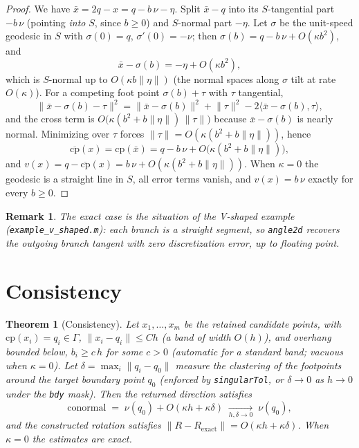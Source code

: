 \documentclass[11pt]{article}
\newtheorem{theorem}{Theorem}
\newtheorem{remark}{Remark}
\newcommand{\cp}{\mathrm{cp}}
\newcommand{\cpbar}{\overline{\mathrm{cp}}}
\newcommand{\norm}[1]{\lVert #1 \rVert}
\newcommand{\ip}[2]{\langle #1, #2 \rangle}
\begin{document}
\begin{proof}
We have $\bar x = 2q-x = q - b\,\nu - \eta$. Split $\bar x - q$ into its
$S$-tangential part $-b\,\nu$ (pointing \emph{into} $S$, since
$b\ge 0$) and $S$-normal part $-\eta$. Let $\sigma$ be the unit-speed
geodesic in $S$ with $\sigma(0)=q$, $\sigma'(0)=-\nu$; then
$\sigma(b) = q - b\,\nu + O(\kappa b^2)$, and
\[
  \bar x - \sigma(b) = -\eta + O(\kappa b^2),
\]
which is $S$-normal up to $O(\kappa b\norm{\eta})$ (the normal spaces
along $\sigma$ tilt at rate $O(\kappa)$). For a competing foot point
$\sigma(b)+\tau$ with $\tau$ tangential,
\[
  \norm{\bar x-\sigma(b)-\tau}^2
  = \norm{\bar x-\sigma(b)}^2 + \norm{\tau}^2
    - 2\ip{\bar x-\sigma(b)}{\tau},
\]
and the cross term is
$O\bigl(\kappa(b^2+b\norm{\eta})\,\norm{\tau}\bigr)$ because
$\bar x-\sigma(b)$ is nearly normal. Minimizing over $\tau$ forces
$\norm{\tau}=O(\kappa(b^2+b\norm{\eta}))$, hence
\[
  \cpbar(x) = \cp(\bar x)
  = q - b\,\nu + O\bigl(\kappa(b^2+b\norm{\eta})\bigr),
\]
and $v(x)=q-\cpbar(x)=b\,\nu+O(\kappa(b^2+b\norm{\eta}))$. When
$\kappa=0$ the geodesic is a straight line in $S$, all error terms
vanish, and $v(x)=b\,\nu$ exactly for every $b\ge0$.
\end{proof}

\begin{remark}
The exact case is the situation of the V-shaped example
(\texttt{example\_v\_shaped.m}): each branch is a straight segment, so
\texttt{angle2d} recovers the outgoing branch tangent with zero
discretization error, up to floating point.
\end{remark}

\section{Consistency}

\begin{theorem}[Consistency]\label{thm:consistency}
Let $x_1,\dots,x_m$ be the retained candidate points, with
$\cp(x_i)=q_i\in\Gamma$, $\norm{x_i-q_i}\le Ch$ (a band of width
$O(h)$), and overhang bounded below, $b_i\ge c\,h$ for some $c>0$
(automatic for a standard band; vacuous when $\kappa=0$). Let
$\delta=\max_i\norm{q_i-q_0}$ measure the clustering of the footpoints
around the target boundary point $q_0$ (enforced by
\texttt{singularTol}, or $\delta\to0$ as $h\to0$ under the \texttt{bdy}
mask). Then the returned direction satisfies
\[
  \mathrm{conormal}
  \;=\; \nu(q_0) + O(\kappa h + \kappa\delta)
  \;\xrightarrow[h,\delta\to0]{}\; \nu(q_0),
\]
and the constructed rotation satisfies
$\norm{R-R_{\mathrm{exact}}} = O(\kappa h + \kappa\delta)$. When
$\kappa=0$ the estimates are exact.
\end{theorem}
\end{document}
